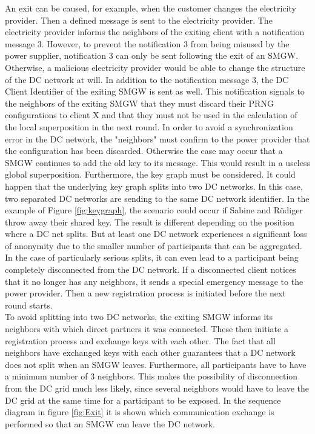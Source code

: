 An exit can be caused, for example, when the customer changes the electricity provider. Then a defined message is sent to the electricity provider. The electricity provider informs the neighbors of the exiting client with a notification message 3. However, to prevent the notification 3 from being misused by the power supplier, notification 3 can only be sent following the exit of an SMGW. Otherwise, a malicious electricity provider would be able to change the structure of the DC network at will. In addition to the notification message 3, the DC Client Identifier of the exiting SMGW is sent as well. This notification signals to the neighbors of the exiting SMGW that they must discard their PRNG configurations to client X and that they must not be used in the calculation of the local superposition in the next round. In order to avoid a synchronization error in the DC network, the "neighbors" must confirm to the power provider that the configuration has been discarded. Otherwise the case may occur that a SMGW continues to add the old key to its message. This would result in a useless global superposition. Furthermore, the key graph must be considered. It could happen that the underlying key graph splits into two DC networks. In this case, two separated DC networks are sending to the same DC network identifier. In the example of Figure \ref{fig:keygraph}, the scenario could occur if Sabine and Rüdiger throw away their shared key. The result is different depending on the position where a DC net splits. But at least one DC network experiences a significant loss of anonymity due to the smaller number of participants that can be aggregated. In the case of particularly serious splits, it can even lead to a participant being completely disconnected from the DC network. If a disconnected client notices that it no longer has any neighbors, it sends a special emergency message to the power provider. Then a new registration process is initiated before the next round starts.\\ To avoid splitting into two DC networks, the exiting SMGW informs its neighbors with which direct partners it was connected. These then initiate a registration process and exchange keys with each other. The fact that all neighbors have exchanged keys with each other guarantees that a DC network does not split when an SMGW leaves. Furthermore, all participants have to have a minimum number of 3 neighbors. This makes the possibility of disconnection from the DC grid much less likely, since several neighbors would have to leave the DC grid at the same time for a participant to be exposed. In the sequence diagram in figure \ref{fig:Exit} it is shown which communication exchange is performed so that an SMGW can leave the DC network.
